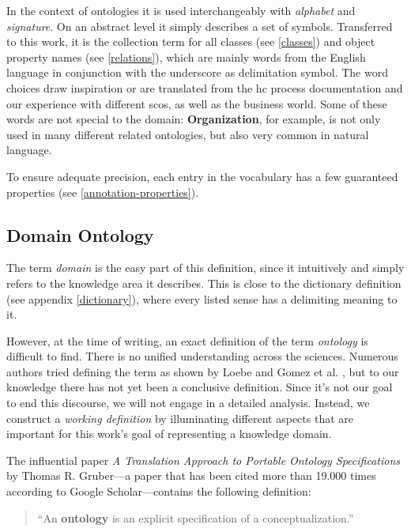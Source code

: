 \documentclass[a4paper, DIV=13, BCOR=0cm]{scrbook}
\begin{document}
In the context of ontologies it is used interchangeably with \textit{alphabet} and \textit{signature}. On an abstract level it simply describes a set of symbols. \cite[p.\,46]{loebe2015ontological} Transferred to this work, it is the collection term for all classes (see \ref{classes}) and object property names (see \ref{relations}), which are mainly words from the English language in conjunction with the underscore as delimitation symbol. The word choices draw inspiration or are translated from the \gls{hc} process documentation and our experience with different \glspl{sco}, as well as the business world. Some of these words are not special to the domain: \textbf{Organization}, for example, is not only used in many different related ontologies, but also very common in natural language.

To ensure adequate precision, each entry in the vocabulary has a few guaranteed properties (see \ref{annotation-properties}).

\subsection{Domain Ontology}
The term \textit{domain} is the easy part of this definition, since it intuitively and simply refers to the knowledge area it describes. \cite[p.\,7]{loebe2015ontological} This is close to the dictionary definition (see appendix \ref{dictionary}), where every listed sense has a delimiting meaning to it. \cite{mw-dictionary}

However, at the time of writing, an exact definition of the term \textit{ontology} is difficult to find. There is no unified understanding across the sciences. \cite{Hesse_2014} Numerous authors tried defining the term as shown by Loebe \cite[p.\,4-6]{loebe2015ontological} and Gomez et al. \cite[p.\, 6--9]{Gomez-Perez:2004aa}, but to our knowledge there has not yet been a conclusive definition. Since it's not our goal to end this discourse, we will not engage in a detailed analysis. Instead, we construct a \textit{working definition} by illuminating different aspects that are important for this work's goal of representing a knowledge domain.

The influential paper \cite[p.\,9]{schulz2012guideline} \cite[p.\,4]{loebe2015ontological} \textit{A Translation Approach to Portable Ontology Specifications} by Thomas R. Gruber---a paper that has been cited more than 19.000 times according to Google Scholar---contains the following definition:

\begin{quote}
	\enquote{An \textbf{ontology} is an explicit specification of a conceptualization.} \cite[p.\, 1]{gruber1993translation}
\end{quote}
\end{document}
